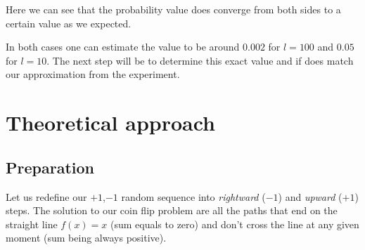 \documentclass[a4paper,13pt,oneside]{article}
\theoremstyle{remark}
\begin{document}
Here we can see that the probability value does converge from both sides to a certain value as we expected.\\
\begin{flushleft}
In both cases one can estimate the value to be around $0.002$ for $l=100$ and $0.05$ for $l=10$.
The next step will be to determine this exact value and if does match our approximation from the experiment. 
\end{flushleft}
  
	
\pagebreak
\section{Theoretical approach}
\subsection{Preparation}

Let us redefine our $+1$,$-1$ random sequence into \textit{rightward} ($-1$) and \textit{upward} ($+1$) steps. The solution to our coin flip problem are all the paths that end on the straight line $f(x) = x$ (sum equals to zero) and don't cross the line at any given moment (sum being always positive).

\bigskip


\begin{center}


\end{center}
\end{document}
